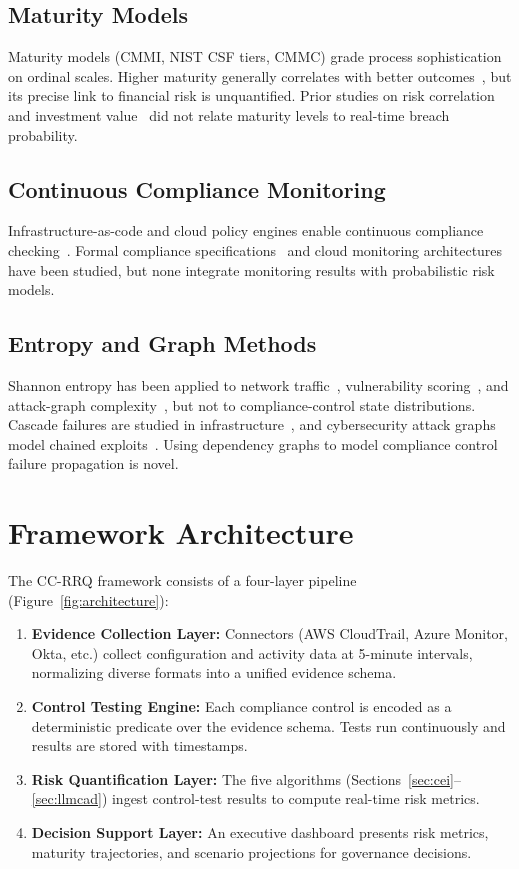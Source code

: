 \documentclass[conference]{IEEEtran}
\begin{document}
\subsection{Maturity Models}
Maturity models (CMMI, NIST CSF tiers, CMMC) grade process sophistication on ordinal scales. Higher maturity generally correlates with better outcomes~\cite{Benz2020,Lund2017}, but its precise link to financial risk is unquantified. Prior studies on risk correlation~\cite{Bohme2006} and investment value~\cite{Cavusoglu2004} did not relate maturity levels to real-time breach probability.

\subsection{Continuous Compliance Monitoring}
Infrastructure-as-code and cloud policy engines enable continuous compliance checking~\cite{Compliance2023}. Formal compliance specifications~\cite{Dekker2007,Strembeck2011} and cloud monitoring architectures~\cite{Sunyaev2013,Haeberlen2010} have been studied, but none integrate monitoring results with probabilistic risk models.

\subsection{Entropy and Graph Methods}
Shannon entropy has been applied to network traffic~\cite{Lakhina2004,Xu2005}, vulnerability scoring~\cite{Wang2008}, and attack-graph complexity~\cite{Ou2006}, but not to compliance-control state distributions. Cascade failures are studied in infrastructure~\cite{Buldyrev2010,Sheffi2005}, and cybersecurity attack graphs model chained exploits~\cite{Sheyner2002,Ammann2002,Bier2009}. Using dependency graphs to model compliance control failure propagation is novel.

\section{Framework Architecture}
\label{sec:framework}

The CC-RRQ framework consists of a four-layer pipeline (Figure~\ref{fig:architecture}):
\begin{enumerate}
  \item \textbf{Evidence Collection Layer:} Connectors (AWS CloudTrail, Azure Monitor, Okta, etc.) collect configuration and activity data at 5-minute intervals, normalizing diverse formats into a unified evidence schema.
  \item \textbf{Control Testing Engine:} Each compliance control is encoded as a deterministic predicate over the evidence schema. Tests run continuously and results are stored with timestamps.
  \item \textbf{Risk Quantification Layer:} The five algorithms (Sections~\ref{sec:cei}--\ref{sec:llmcad}) ingest control-test results to compute real-time risk metrics.
  \item \textbf{Decision Support Layer:} An executive dashboard presents risk metrics, maturity trajectories, and scenario projections for governance decisions.
\end{enumerate}
\end{document}
